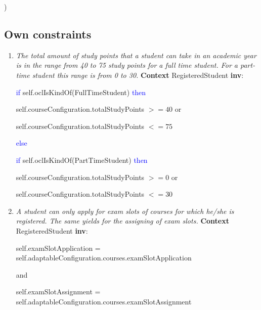 \begin{enumerate}
	 \par \hspace*{10 mm} )
	
\end{enumerate}

\subsection{Own constraints}

\begin{enumerate}
	\item \emph{The total amount of study points that a student can take in an
	academic year is in the range from 40 to 75 study points for a full time
	student. For a part-time student this range is from 0 to 30.}
	\npar \textbf{Context} RegisteredStudent \textbf{inv}:
	\par \hspace*{5 mm} \textcolor{Blue}{if} self.oclIsKindOf(FullTimeStudent)
	\textcolor{Blue}{then}
	\par \hspace*{10 mm} self.courseConfiguration.totalStudyPoints $>= 40$ or
	\par \hspace*{10 mm} self.courseConfiguration.totalStudyPoints $<= 75$
	\par \hspace*{5 mm} \textcolor{Blue}{else}
	\par \hspace*{10 mm} \textcolor{Blue}{if} self.oclIsKindOf(PartTimeStudent)
	\textcolor{Blue}{then}
	\par \hspace*{15 mm} self.courseConfiguration.totalStudyPoints $>= 0$ or
	\par \hspace*{15 mm} self.courseConfiguration.totalStudyPoints $<= 30$
	
	\item \emph{A student can only apply for exam slots of
	courses for which he/she is registered. The same yields for the assigning of
	exam slots.}
	\npar \textbf{Context} RegisteredStudent \textbf{inv}:
	\par \hspace*{5 mm} self.examSlotApplication =
	self.adaptableConfiguration.courses.examSlotApplication
	\par \hspace*{5 mm} and
	\par \hspace*{5 mm} self.examSlotAssignment =
	self.adaptableConfiguration.courses.examSlotAssignment
	

\end{enumerate}

